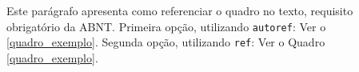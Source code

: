 \documentclass[
	12pt,				%
	openright,			%
	oneside,			    %
	a4paper,				%
	english,			%
	french,			%
	spanish,			%
	brazil			%
	]{abntex2}
\begin{document}
Este parágrafo apresenta como referenciar o quadro no texto, requisito
obrigatório da ABNT. 
Primeira opção, utilizando \texttt{autoref}: Ver o \autoref{quadro_exemplo}. 
Segunda opção, utilizando  \texttt{ref}: Ver o Quadro \ref{quadro_exemplo}.


\postextual


\end{document}
